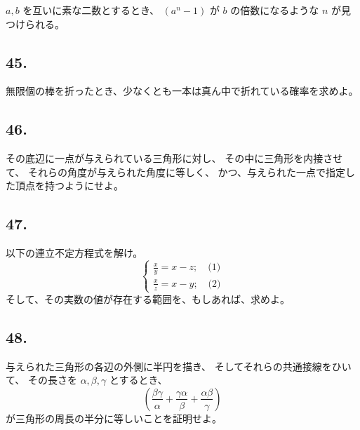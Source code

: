 $a, b$ を互いに素な二数とするとき、
$(a^n - 1)$ が $b$ の倍数になるような $n$ が見つけられる。

\begin{flushright}
[18/3/81]
\end{flushright}

\subsection*{45.}

無限個の棒を折ったとき、少なくとも一本は真ん中で折れている確率を求めよ。

\begin{flushright}
[5/84]
\end{flushright}

\subsection*{46.}

その底辺に一点が与えられている三角形に対し、
その中に三角形を内接させて、
それらの角度が与えられた角度に等しく、
かつ、与えられた一点で指定した頂点を持つようにせよ。

\begin{flushright}
[19/11/87]
\end{flushright}

\subsection*{47.}

以下の連立不定方程式を解け。
\[
\left\{
\begin{array}{ll}
\frac{x}{y} = x - z; \quad \mbox{(1)}\\
\frac{x}{z} = x - y; \quad \mbox{(2)}
\end{array}
\right.
\]
そして、その実数の値が存在する範囲を、もしあれば、求めよ。

\begin{flushright}
[12/90]
\end{flushright}

\subsection*{48.}

与えられた三角形の各辺の外側に半円を描き、
そしてそれらの共通接線をひいて、
その長さを $\alpha, \beta, \gamma$ とするとき、
\[
\left(
\frac{\beta \gamma}{\alpha} + 
\frac{\gamma \alpha}{\beta} + \frac{\alpha \beta}{\gamma}
\right)
\]
が三角形の周長の半分に等しいことを証明せよ。

